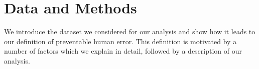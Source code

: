 \documentclass{article}
\theoremstyle{plain}
\theoremstyle{definition}
\theoremstyle{remark}
\begin{document}

\section{Data and Methods}\label{sec:methods}
We introduce the dataset we considered for our analysis and show how it leads to our definition of preventable human error. This definition is motivated by a number of factors which we explain in detail, followed by a description of our analysis.



\end{document}
